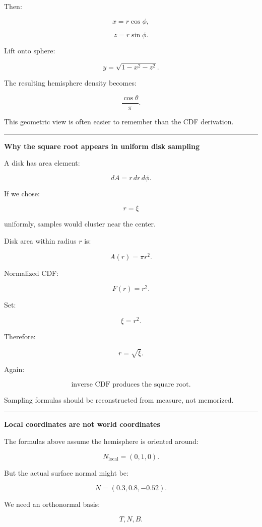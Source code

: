 Then:

\[
x=r\cos\phi,
\]

\[
z=r\sin\phi.
\]

Lift onto sphere:

\[
y=\sqrt{1-x^2-z^2}.
\]

The resulting hemisphere density becomes:

\[
\frac{\cos\theta}{\pi}.
\]

This geometric view is often easier to remember than the CDF derivation.

\begin{center}\rule{0.5\linewidth}{0.5pt}\end{center}

\textbf{Why the square root appears in uniform disk sampling}

A disk has area element:

\[
dA=r\,dr\,d\phi.
\]

If we chose:

\[
r=\xi
\]

uniformly, samples would cluster near the center.

Disk area within radius \(r\) is:

\[
A(r)=\pi r^2.
\]

Normalized CDF:

\[
F(r)=r^2.
\]

Set:

\[
\xi=r^2.
\]

Therefore:

\[
\boxed{
r=\sqrt{\xi}.
}
\]

Again:

\[
\boxed{
\text{inverse CDF produces the square root.}
}
\]

Sampling formulas should be reconstructed from measure, not memorized.

\begin{center}\rule{0.5\linewidth}{0.5pt}\end{center}

\textbf{Local coordinates are not world coordinates}

The formulas above assume the hemisphere is oriented around:

\[
N_{\text{local}}=(0,1,0).
\]

But the actual surface normal might be:

\[
N=(0.3,0.8,-0.52).
\]

We need an orthonormal basis:

\[
T,
N,
B.
\]

